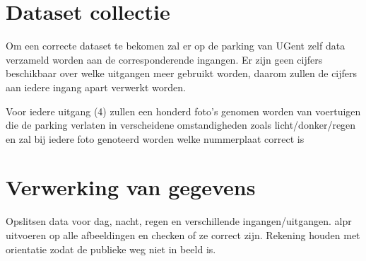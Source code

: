 \section{Dataset collectie}
Om een correcte dataset te bekomen zal er op de parking van UGent zelf data verzameld worden aan de corresponderende ingangen. Er zijn geen cijfers beschikbaar over welke uitgangen meer gebruikt worden, daarom zullen de cijfers aan iedere ingang apart verwerkt worden.

Voor iedere uitgang (4) zullen een honderd foto's genomen worden van voertuigen die de parking verlaten in verscheidene omstandigheden zoals licht/donker/regen en zal bij iedere foto genoteerd worden welke nummerplaat correct is

\section{Verwerking van gegevens}

Opslitsen data voor dag, nacht, regen en verschillende ingangen/uitgangen.
alpr uitvoeren op alle afbeeldingen en checken of ze correct zijn. Rekening houden met orientatie zodat de publieke weg niet in beeld is.